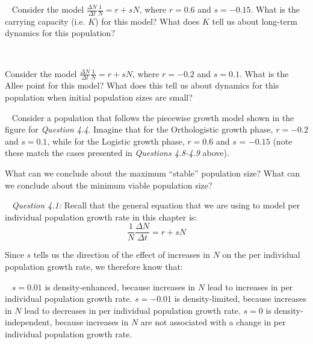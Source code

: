 \documentclass[12pt]{article}
\begin{document}
~\newline
{}
\newline
Consider the model $\frac{\Delta N}{\Delta t}\frac{1}{N} = r + s N$, where $r=0.6$ and $s=-0.15$. What is the carrying capacity (i.e. $K$) for this model? What does $K$ tell us about long-term dynamics for this population?

~\pagebreak

\newline
Consider the model $\frac{\Delta N}{\Delta t}\frac{1}{N} = r + s N$, where $r=-0.2$ and $s=0.1$. What is the Allee point for this model? What does this tell us about dynamics for this population when initial population sizes are small?

~\newline
{}
\newline
Consider a population that follows the piecewise growth model shown in the figure for \textit{Question 4.4}. Imagine that for the Orthologistic growth phase, $r = -0.2$ and $s = 0.1$, while for the Logistic growth phase, $r = 0.6$ and $s$ = $-0.15$ (note these match the cases presented in \textit{Questions 4.8-4.9} above).

What can we conclude about the maximum ``stable'' population size? What can we conclude about the minimum viable population size?

\pagebreak
{}

~\newline
\textit{Question 4.1:}
\newline
Recall that the general equation that we are using to model per individual population growth rate in this chapter is:
\begin{equation*}
\frac{1}{N}\frac{\Delta N}{\Delta t} = r + sN
\end{equation*}

Since $s$ tells us the direction of the effect of increases in $N$ on the per individual population growth rate, we therefore know that:

~\newline
$s=0.01$ is density-enhanced, because increases in $N$ lead to increases in per individual population growth rate.
\newline
$s=-0.01$ is density-limited, because increases in $N$ lead to decreases in per individual population growth rate.
\newline
$s=0$ is density-independent, because increases in $N$ are not associated with a change in per individual population growth rate.
\end{document}
